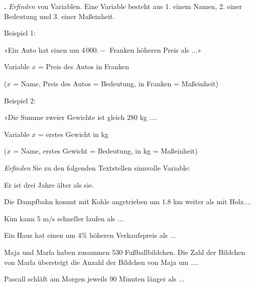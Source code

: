 \platzFuerBerechnungenBisEndeSeite{}
\newpage


\textbf{\bbwAufgabenNummer{}.}
\textit{Erfinden} von Variablen. Eine Variable besteht aus 1. einem
Namen, 2. einer Bedeutung und 3. einer Maßeinheit.

Beispiel 1:

«Ein Auto hat einen um $4\,000.-$ Franken höheren Preis als ...»

Variable $x$ = Preis des Autos in Franken

($x$ = Name, Preis des Autos = Bedeutung, in Franken = Maßeinheit)

Beispiel 2:

«Die Summe zweier Gewichte ist gleich $280$ kg ....

Variable $x$ = erstes Gewicht in kg

($x$ = Name, erstes Gewicht = Bedeutung, in kg = Maßeinheit)


\textit{Erfinden} Sie zu den folgenden Textstellen sinnvolle Variable:

\begin{bbwAufgabenBlock}


\item Er ist drei Jahre älter als sie.


\item Die Dampfbahn kommt mit Kohle angetrieben um $1.8$ km weiter als mit
Holz....


\item Kim kann $5$ m/s schneller laufen als ...


\item Ein Haus hat einen um $4$\% höheren Verkaufspreis als ...


\noTRAINER{\newpage}

\item Maja und Marla haben zusammen 530 Fußballbildchen. Die Zahl der
Bildchen von Marla übersteigt die Anzahl der Bildchen von Maja um ....


\item Pascall schläft am Morgen jeweils 90 Minuten länger als ...


\end{bbwAufgabenBlock}

